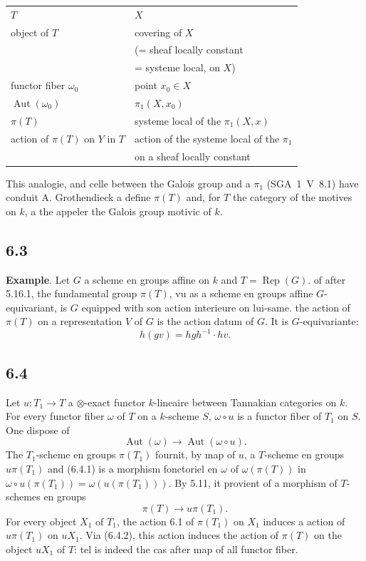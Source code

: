 \documentclass[12pt,a4paper]{article}
\theoremstyle{plain}
\theoremstyle{definition}
\theoremstyle{remark}
\DeclareMathOperator{\Aut}{Aut}
\DeclareMathOperator{\Rep}{Rep}
\begin{document}
\begin{center}
\begin{tabular}{ll}
$T$ & $X$ \\
object of $T$ & covering of $X$ \\
& (= sheaf locally constant \\
& = systeme local, on $X$) \\
functor fiber $\omega_0$ & point $x_0 
\in X$ \\
$\Aut(\omega_0)$ & $\pi_1(X,x_0)$ \\
$\pi(T)$ & systeme local of the $\pi_1(X,x)$ \\
action of $\pi(T)$ on $Y$ in $T$ & action of the systeme local of the $\pi_1$ \\
& on a sheaf locally constant
\end{tabular}
\end{center}

This analogie, and celle between the Galois group and a $\pi_1$ (SGA~1~V~8.1) have conduit A. Grothendieck a define $\pi(T)$ and, for $T$ the category of the motives on $k$, a the appeler the Galois group motivic of $k$.

\subsection*{6.3}
\textbf{Example}. Let $G$ a scheme en groups affine on $k$ and $T = 
\Rep(G)$. of after 5.16.1, the fundamental group $\pi(T)$, vu as a scheme en groups affine $G$-equivariant, is $G$ equipped with son action interieure on lui-same. the action of $\pi(T)$ on a representation $V$ of $G$ is the action datum of $G$. It is $G$-equivariante:
\[
h(gv) = hgh^{-1} 
\cdot hv.
\]

\subsection*{6.4}
Let $u: T_1 
\to T$ a $\otimes$-exact functor $k$-lineaire between Tannakian categories on $k$. For every functor fiber $\omega$ of $T$ on a $k$-scheme $S$, $\omega 
\circ u$ is a functor fiber of $T_1$ on $S$. One dispose of
\begin{equation*}\tag{6.4.1}
\Aut(\omega) 
\longrightarrow 
\Aut(\omega 
\circ u).
\end{equation*}
The $T_1$-scheme en groups $\pi(T_1)$ fournit, by map of $u$, a $T$-scheme en groups $u\pi(T_1)$ and (6.4.1) is a morphism fonctoriel en $\omega$ of $\omega(\pi(T))$ in $\omega 
\circ u(\pi(T_1)) = 
\omega(u(\pi(T_1)))$. By 5.11, it provient of a morphism of $T$-schemes en groups
\begin{equation*}\tag{6.4.2}
\pi(T) 
\longrightarrow u\pi(T_1).
\end{equation*}
For every object $X_1$ of $T_1$, the action 6.1 of $\pi(T_1)$ on $X_1$ induces a action of $u\pi(T_1)$ on $uX_1$. Via (6.4.2), this action induces the action of $\pi(T)$ on the object $uX_1$ of $T$: tel is indeed the cas after map of all functor fiber.
\end{document}
